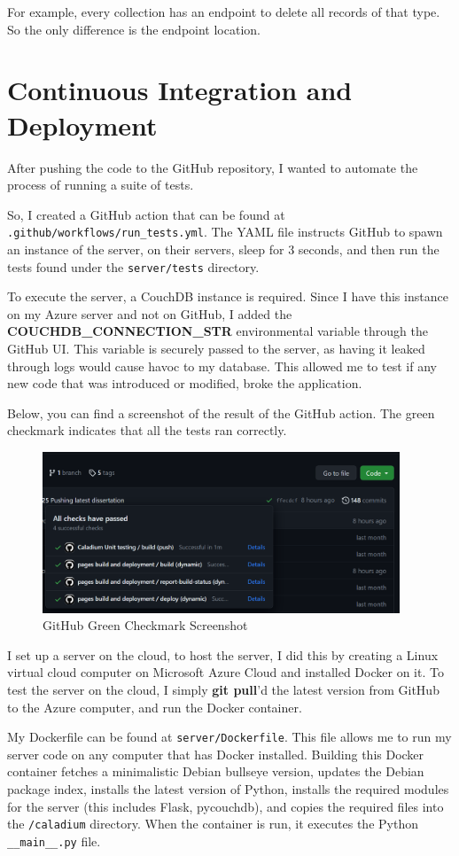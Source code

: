 For example, every collection has an endpoint to delete all records of that type.
So the only difference is the endpoint location.

\section{Continuous Integration and Deployment}
After pushing the code to the GitHub repository,
I wanted to automate the process of running a suite of tests.

So, I created a GitHub action that can be found at \\
\texttt{.github/workflows/run\_tests.yml}.
The YAML file instructs GitHub to spawn an instance of the server, on their servers,
sleep for 3 seconds, and then run the tests found
under the \texttt{server/tests} directory.

To execute the server, a CouchDB instance is required.
Since I have this instance on my Azure server and not on GitHub, I added the \\
\textbf{COUCHDB\_CONNECTION\_STR}
environmental variable through the GitHub UI.
This variable is securely passed to the server,
as having it leaked through logs would cause havoc to my database.
This allowed me to test if any new code that
was introduced or modified, broke the application.

Below, you can find a screenshot of the result of the GitHub action.
The green checkmark indicates that all the tests ran correctly.
\begin{figure}[h!]
    \centering
    \label{image:githubGreenCheckmark}
    \includegraphics[width=0.95\textwidth]{images/screenshots/green_check}
    \caption{GitHub Green Checkmark Screenshot}
\end{figure}

I set up a server on the cloud, to host the server,
I did this by creating a Linux virtual cloud computer on
Microsoft Azure Cloud and installed Docker on it.
To test the server on the cloud, I simply \textbf{git pull}'d
the latest version from GitHub to the Azure computer,
and run the Docker container.

My Dockerfile can be found at \texttt{server/Dockerfile}.
This file allows me to run my server code on any computer that has Docker installed.
Building this Docker container fetches a minimalistic Debian bullseye version,
updates the Debian package index, installs the latest version of Python,
installs the required modules for the server (this includes Flask, pycouchdb),
and copies the required files into the \texttt{/caladium} directory.
When the container is run, it executes the Python \texttt{\_\_main\_\_.py} file.
